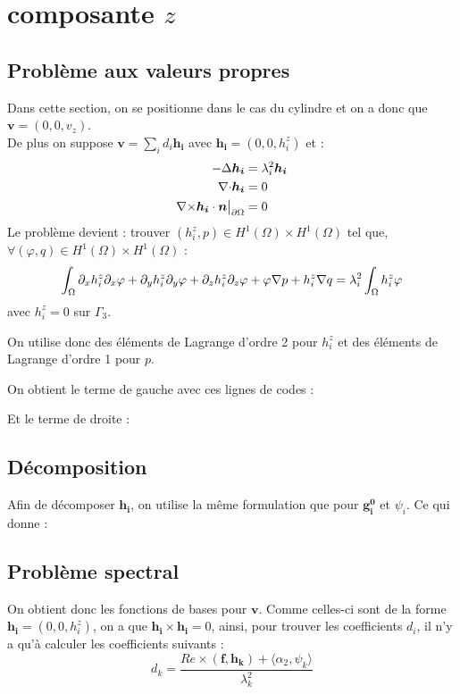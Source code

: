 \section{composante $z$}
\label{compZ}
\subsection{Problème aux valeurs propres}

Dans cette section, on se positionne dans le cas du cylindre et on a donc que $\bm{v}=(0,0,v_z)$.\\
De plus on suppose $\bm{v}=\sum_i d_i\bm{h_i}$ avec $\bm{h_i}=(0,0,h_i^z)$ et :
\begin{align*}
-{\Delta}\bm{h_i} &= \lambda^2_i \bm{h_i}\\
{\nabla\cdot} \bm{h_i} &= 0\\
{\nabla\times}\bm{h_i}\cdot\bm{n}{\big\rvert_{\partial\Omega}} &= 0
\end{align*}
Le problème devient : trouver $(h_i^z,p)\in H^1(\Omega)\times H^1(\Omega)$ tel que, $\forall (\varphi,q)\in H^1(\Omega)\times H^1(\Omega)$ :
\[
\int_\Omega \partial_x h_i^z \partial_x\varphi + \partial_y h_i^z \partial_y\varphi + \partial_z h_i^z \partial_z\varphi + \varphi{\nabla} p + h_i^z{\nabla} q = \lambda_i^2 \int_\Omega h_i^z\varphi
\]
avec $h_i^z = 0$ sur $\Gamma_3$.

On utilise donc des éléments de Lagrange d'ordre 2 pour $h_i^z$ et des éléments de Lagrange d'ordre 1 pour $p$.


On obtient le terme de gauche avec ces lignes de codes :


Et le terme de droite :


\subsection{Décomposition}
Afin de décomposer $\bm{h_i}$, on utilise la même formulation que pour $\bm{g_i^0}$ et $\psi_i$. Ce qui donne :



\subsection{Problème spectral}
On obtient donc les fonctions de bases pour $\bm{v}$. Comme celles-ci sont de la forme $\bm{h_i}=(0,0,h_i^z)$, on a que $\bm{h_i}\times\bm{h_i}=0$, ainsi, pour trouver les coefficients $d_i$, il n'y a qu'à calculer les coefficients suivants :
\[
d_k = \frac{Re\times (\bm{f},\bm{h_k})+\langle \alpha_2,\psi_k\rangle}{\lambda_k^2}
\]

